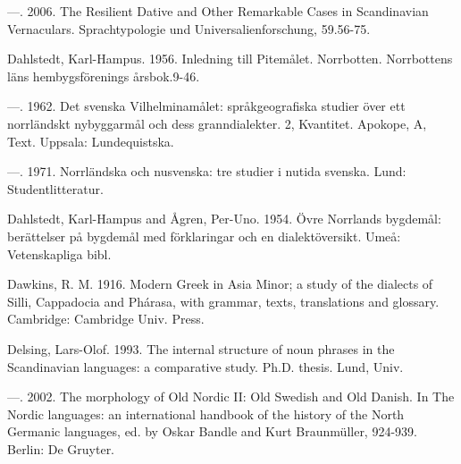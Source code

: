 \begin{styleBodytextC}
—. 2006. The Resilient Dative and Other Remarkable Cases in Scandinavian Vernaculars. Sprachtypologie und Universalienforschung, 59.56-75.

\end{styleBodytextC}

\begin{styleBodytextC}
Dahlstedt, Karl-Hampus. 1956. Inledning till Pitemålet. Norrbotten. Norrbottens läns hembygsförenings årsbok.9-46.

\end{styleBodytextC}

\begin{styleBodytextC}
—. 1962. Det svenska Vilhelminamålet: språkgeografiska studier över ett norrländskt nybyggarmål och dess granndialekter. 2, Kvantitet. Apokope, A, Text. Uppsala: Lundequistska.

\end{styleBodytextC}

\begin{styleBodytextC}
—. 1971. Norrländska och nusvenska: tre studier i nutida svenska. Lund: Studentlitteratur.

\end{styleBodytextC}

\begin{styleBodytextC}
Dahlstedt, Karl-Hampus and Ågren, Per-Uno. 1954. Övre Norrlands bygdemål: berättelser på bygdemål med förklaringar och en dialektöversikt. Umeå: Vetenskapliga bibl.

\end{styleBodytextC}

\begin{styleBodytextC}
Dawkins, R. M. 1916. Modern Greek in Asia Minor; a study of the dialects of Silli, Cappadocia and Phárasa, with grammar, texts, translations and glossary. Cambridge: Cambridge Univ. Press.

\end{styleBodytextC}

\begin{styleBodytextC}
Delsing, Lars-Olof. 1993. The internal structure of noun phrases in the Scandinavian languages: a comparative study. Ph.D. thesis. Lund, Univ.

\end{styleBodytextC}

\begin{styleBodytextC}
—. 2002. The morphology of Old Nordic II: Old Swedish and Old Danish. In The Nordic languages: an international handbook of the history of the North Germanic languages, ed. by Oskar Bandle and Kurt Braunmüller, 924-939. Berlin: De Gruyter.

\end{styleBodytextC}


